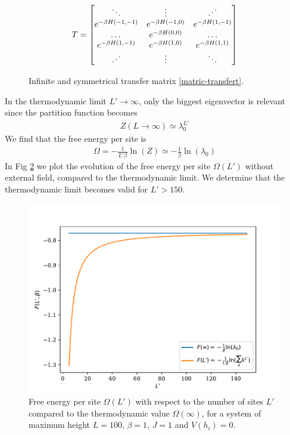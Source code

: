 {\begin{figure}
    \begin{align}
    T = \begin{bmatrix} 
            \ddots & \vdots & \reflectbox{$\ddots$} \\ 
            e^{-\beta H(-1,-1)} &  e^{-\beta H(-1,0)} & e^{-\beta H(1,-1)} \\
            \dots & e^{-\beta H(0,0)} & \dots  \\
            e^{-\beta H(1,-1)} & e^{-\beta H(1,0)} & e^{-\beta H(1,1)}   \\ 
             \reflectbox{$\ddots$} & \vdots &\ddots  \\ 
        \end{bmatrix}
    \end{align}
    \caption{Infinite and symmetrical transfer matrix \ref{matric-transfert}.}
    \label{mat-inf}
\end{figure}

In the thermodynamic limit $L' \to \infty$, only the biggest eigenvector is relevant since the partition function becomes
\begin{align}
    Z(L\to \infty) \simeq \lambda_0^{L'}
\end{align}
We find that the free energy per site is 
\begin{align}
	\Omega =  - \frac{1}{L' \beta} \ln(Z) \simeq - \frac{1}{\beta } \ln( \lambda_0)
	\label{energie-libre-site}
\end{align}
In Fig \ref{fig-thermo-libre} we plot the evolution of the free energy per site $\Omega(L')$ without external field, compared to the thermodynamic limit. We determine that the thermodynamic limit becomes valid for $L' \greater 150 $.

\begin{figure}
    \centering
	\includegraphics[width=0.7\linewidth]{int-dyn/freeene-thermo-libre.pdf}
	\caption{Free energy per site $\Omega(L')$ with respect to the number of sites $L'$ compared to the thermodynamic value $\Omega(\infty)$, for a system of maximum height $L=100$, $\beta=1$, $J=1$ and $V(h_i)=0$.}
	\label{fig-thermo-libre}
	\vspace{-0.5cm}
\end{figure}  

}
